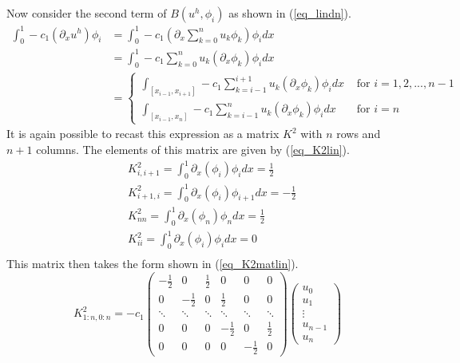 \documentclass[11pt,fleqn]{article}
\theoremstyle{defstyle}
\begin{document}
Now consider the second term of $B(u^h, \phi_i)$ as shown in (\ref{eq_lindn}).
\begin{equation}
\begin{aligned}
\int_0^1 -c_1(\partial_xu^h)\phi_i &= \int_0^1 - c_1(\partial_x \sum_{k=0}^{n} u_k\phi_k)\phi_i dx \\
&= \int_0^1 -c_1\sum_{k=0}^{n} u_k(\partial_x\phi_k)\phi_idx \\
&= \begin{cases}
\int_{[x_{i-1},x_{i+1}]}-c_1\sum_{k=i-1}^{i+1} u_k(\partial_x\phi_k)\phi_idx &\text{ for } i=1,2,..., n-1 \\
\int_{[x_{i-1},x_{n}]}-c_1\sum_{k=i-1}^{n} u_k(\partial_x\phi_k)\phi_idx &\text{ for } i=n
\end{cases}
\end{aligned}
\label{eq_lindn}
\end{equation}
It is again possible to recast this expression as a matrix $K^2$ with $n$ rows and $n+1$ columns. The elements of this matrix are given by (\ref{eq_K2lin}).
\begin{equation}
\begin{aligned}
&K^2_{i,i+1}=\int^1_0 \partial_x(\phi_i)\phi_{i}dx = \frac{1}{2}\\
&K^2_{i+1,i}=\int^1_0 \partial_x(\phi_i)\phi_{i+1}dx = -\frac{1}{2} \\
&K^2_{nn} = \int^1_0 \partial_x(\phi_n)\phi_{n}dx = \frac{1}{2} \\
&K^2_{ii} = \int^1_0 \partial_x(\phi_i)\phi_{i}dx = 0 \\
\end{aligned}
\label{eq_K2lin}
\end{equation}
This matrix then takes the form shown in (\ref{eq_K2matlin}).
\begin{equation}
K^2_{1:n,0:n} = -c_1\begin{pmatrix}
-\frac{1}{2} & 0 & \frac{1}{2} & 0 & 0 &  0\\
0 & -\frac{1}{2} & 0 & \frac{1}{2} & 0 & 0  \\
\ddots & \ddots & \ddots & \ddots & \ddots & \ddots \\
0 & 0 & 0  & -\frac{1}{2} & 0 & \frac{1}{2} \\
0 & 0 & 0 & 0 & -\frac{1}{2} & 0   
\end{pmatrix}
\begin{pmatrix}
u_0 \\ u_1 \\ \vdots \\ u_{n-1} \\ u_n
\end{pmatrix}
\label{eq_K2matlin}
\end{equation}
\end{document}
